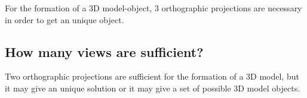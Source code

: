 \documentclass[12pt]{article}
\begin{document}
For the formation of a 3D model-object, 3 orthographic projections are necessary in order to get an unique object.

\subsection{How many views are sufficient?}

Two orthographic projections are sufficient for the formation of a 3D model, but it may give an unique solution or it may give a set of possible 3D model objects.

\newpage





%
%
% 
% 
\end{document}
